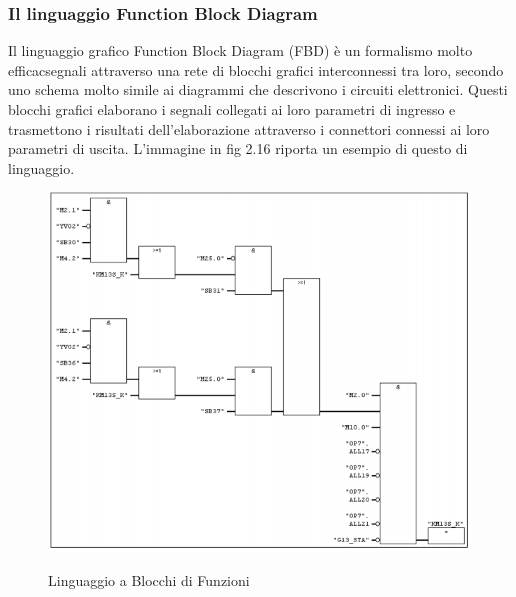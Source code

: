 \documentclass[12pt, a4paper, oneside]{book}
\begin{document}
\subsubsection{Il linguaggio Function Block Diagram}
Il linguaggio grafico Function Block Diagram (FBD) è un formalismo molto efficacsegnali attraverso una rete di blocchi grafici interconnessi tra loro, secondo uno schema molto simile ai diagrammi che descrivono i circuiti elettronici. Questi blocchi grafici elaborano i segnali collegati ai loro parametri di ingresso e trasmettono i risultati dell'elaborazione attraverso i connettori connessi ai loro parametri di uscita.
L'immagine in fig 2.16 riporta un esempio di questo di linguaggio.

	\begin{figure}[H]
	\centering
	\includegraphics[width=12cm]{Immagini/FB}
	\label{FB}
	\caption{Linguaggio a Blocchi di Funzioni}
\end{figure}
\end{document}
